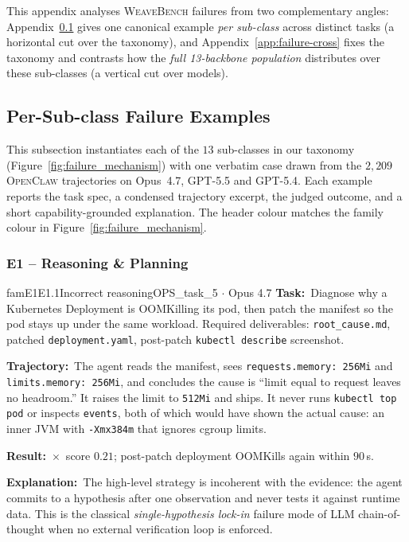\documentclass{llmxive}
\providecommand{\Eyeson}{\textsc{WeaveBench}\xspace}
\providecommand{\fbtask}[1]{\textbf{Task:}~#1\par\smallskip}
\providecommand{\fbtraj}[1]{\textbf{Trajectory:}~#1\par\smallskip}
\providecommand{\fbresult}[1]{\textbf{Result:}~#1\par\smallskip}
\providecommand{\fbexplain}[1]{\textbf{Explanation:}~#1}
\providecommand{\section}[1]{  \oldappendixsection{#1}  \setcounter{table}{0}  \setcounter{figure}{0}}
\begin{document}
\FloatBarrier
\section{Failure Analysis}
\label{app:failure-analysis}

This appendix analyses \Eyeson{} failures from two complementary angles:
Appendix~\ref{app:failure-examples} gives one canonical example \emph{per sub-class}
across distinct tasks (a horizontal cut over the taxonomy), and
Appendix~\ref{app:failure-cross} fixes the taxonomy and contrasts how the
\emph{full 13-backbone population} distributes over these sub-classes
(a vertical cut over models).

\subsection{Per-Sub-class Failure Examples}
\label{app:failure-examples}

This subsection instantiates each of the $13$ sub-classes in our taxonomy
(Figure~\ref{fig:failure_mechanism}) with one verbatim case drawn from the
$2{,}209$ \textsc{OpenClaw} trajectories on Opus~4.7, GPT-5.5 and GPT-5.4.
Each example reports the task spec, a condensed trajectory excerpt, the
judged outcome, and a short capability-grounded explanation. The header
colour matches the family colour in Figure~\ref{fig:failure_mechanism}.

\subsubsection{E1 -- Reasoning \& Planning}

\begin{failbox}{famE1}{E1.1}{Incorrect reasoning}{OPS\_task\_5 \(\cdot\) Opus 4.7}
\fbtask{Diagnose why a Kubernetes Deployment is OOMKilling its pod, then patch the manifest so the pod stays up under the same workload. Required deliverables: \texttt{root\_cause.md}, patched \texttt{deployment.yaml}, post-patch \texttt{kubectl describe} screenshot.}
\fbtraj{The agent reads the manifest, sees \texttt{requests.memory: 256Mi} and \texttt{limits.memory: 256Mi}, and concludes the cause is ``limit equal to request leaves no headroom.'' It raises the limit to \texttt{512Mi} and ships. It never runs \texttt{kubectl top pod} or inspects \texttt{events}, both of which would have shown the actual cause: an inner JVM with \texttt{-Xmx384m} that ignores cgroup limits.}
\fbresult{$\times$~score $0.21$; post-patch deployment OOMKills again within $90$\,s.}
\fbexplain{The high-level strategy is incoherent with the evidence: the agent commits to a hypothesis after one observation and never tests it against runtime data. This is the classical \emph{single-hypothesis lock-in} failure mode of LLM chain-of-thought when no external verification loop is enforced.}
\end{failbox}
\end{document}
